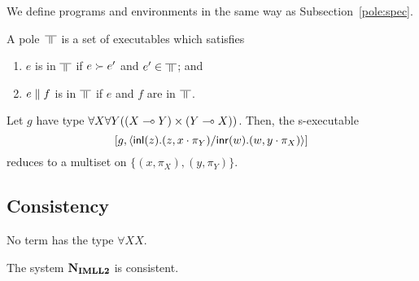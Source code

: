 We define programs and environments in the same way as
Subsection~\ref{pole:spec}.

\begin{definition}
 \label{ex:def:pole}
A pole~$\bbot$ is a set of executables
which satisfies
\begin{enumerate}
 \item \label{ex:red-closed} $e$ is in $\bbot$ if $e\succ e'$ and
       $e'\in\bbot$; and
 \item \label{ex:conc-closed} $e\parallel f$ is in $\bbot$ if $e$ and $f$ are in $\bbot$.
\end{enumerate}
\end{definition}


 \begin{theorem}[Adequacy]
 \end{theorem}

  \begin{proposition}
   Let $g$ have type ${\forall X\forall
   Y((X\multimap Y)\times (Y\multimap X))}$.
   Then, the s-executable
   \[
   [g, \langle \mathsf{inl}({z}). ({z},{x\cdot\pi_Y})/ \mathsf{inr}({w}). ({w},{y\cdot\pi_X})\rangle]
   \]
   reduces to a multiset on
   $\{(x,\pi_X), (y,\pi_Y)\}$.
  \end{proposition}

\subsection{Consistency}

\begin{proposition}
  No term has the type $\forall X X$.
\end{proposition}
\begin{corollary}
 The system $\mathbf{N}_{\mathbf{IMLL2}}$ is consistent.
\end{corollary}
